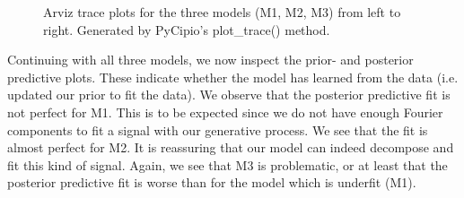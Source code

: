 \documentclass{article}
\begin{document}
\begin{figure}[H]
    \centering
    \quad
    \quad
    \caption{Arviz trace plots for the three models (M1, M2, M3) from left to right. Generated by PyCipio's plot\_trace() method.}
\end{figure}

\noindent Continuing with all three models, we now inspect the prior- and posterior predictive plots. These indicate whether the model has learned from the data (i.e. updated our prior to fit the data). We observe that the posterior predictive fit is not perfect for M1. This is to be expected since we do not have enough Fourier components to fit a signal with our generative process. We see that the fit is almost perfect for M2. It is reassuring that our model can indeed decompose and fit this kind of signal. Again, we see that M3 is problematic, or at least that the posterior predictive fit is worse than for the model which is underfit (M1). 
\end{document}
